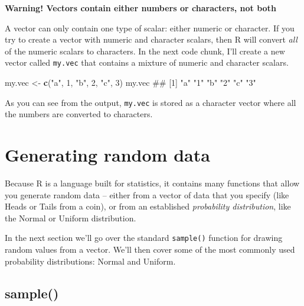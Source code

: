 \documentclass[]{book}
\newenvironment{Shaded}{\begin{snugshade}}{\end{snugshade}}
\newcommand{\KeywordTok}[1]{\textcolor[rgb]{0.13,0.29,0.53}{\textbf{#1}}}
\newcommand{\DecValTok}[1]{\textcolor[rgb]{0.00,0.00,0.81}{#1}}
\newcommand{\StringTok}[1]{\textcolor[rgb]{0.31,0.60,0.02}{#1}}
\newcommand{\NormalTok}[1]{#1}
\theoremstyle{definition}
\theoremstyle{definition}
\theoremstyle{remark}
\begin{document}
\textbf{Warning! Vectors contain either numbers or characters, not both}

A vector can only contain one type of scalar: either numeric or
character. If you try to create a vector with numeric and character
scalars, then R will convert \emph{all} of the numeric scalars to
characters. In the next code chunk, I'll create a new vector called
\texttt{my.vec} that contains a mixture of numeric and character
scalars.

\begin{Shaded}
\begin{Highlighting}[]
\NormalTok{my.vec <-}\StringTok{ }\KeywordTok{c}\NormalTok{(}\StringTok{"a"}\NormalTok{, }\DecValTok{1}\NormalTok{, }\StringTok{"b"}\NormalTok{, }\DecValTok{2}\NormalTok{, }\StringTok{"c"}\NormalTok{, }\DecValTok{3}\NormalTok{)}
\NormalTok{my.vec}
\NormalTok{## [1] "a" "1" "b" "2" "c" "3"}
\end{Highlighting}
\end{Shaded}

As you can see from the output, \texttt{my.vec} is stored as a character
vector where all the numbers are converted to characters.

\section{Generating random data}\label{generating-random-data}

Because R is a language built for statistics, it contains many functions
that allow you generate random data -- either from a vector of data that
you specify (like Heads or Tails from a coin), or from an established
\emph{probability distribution}, like the Normal or Uniform
distribution.

In the next section we'll go over the standard \texttt{sample()}
function for drawing random values from a vector. We'll then cover some
of the most commonly used probability distributions: Normal and Uniform.

\subsection{sample()}\label{sample}
\end{document}
